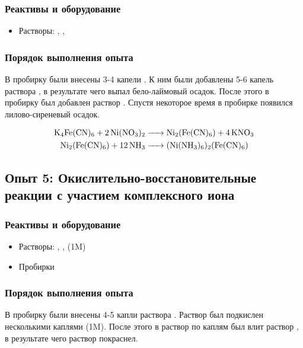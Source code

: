 \documentclass[a4paper, 12pt]{article}
\begin{document}
\subsubsection{Реактивы и оборудование}

\begin{itemize}
	\item Растворы: , , 
\end{itemize}

\subsubsection{Порядок выполнения опыта}

В пробирку были внесены 3-4 капели . К ним были добавлены 5-6 капель раствора , в результате чего выпал бело-лаймовый осадок. После этого в пробирку был добавлен раствор . Спустя некоторое время в пробирке появился лилово-сиреневый осадок.

\begin{align}
	\ce{K4Fe(CN)6 + 2Ni(NO3)2 &-> Ni2(Fe(CN)6) + 4KNO3} \\
	\ce{Ni2(Fe(CN)6) + 12NH3 &-> (Ni(NH3)6)2(Fe(CN)6)}
\end{align}

\subsection{Опыт 5: Окислительно-восстановительные реакции с участием комплексного иона}

\subsubsection{Реактивы и оборудование}

\begin{itemize}
	\item Растворы: , ,  (1M)
	
	\item Пробирки
\end{itemize}

\subsubsection{Порядок выполнения опыта}

В пробирку были внесены 4-5 капли раствора . Раствор был подкислен несколькими каплями  (1M). После этого в раствор по каплям был влит раствор , в результате чего раствор покраснел.
\end{document}
